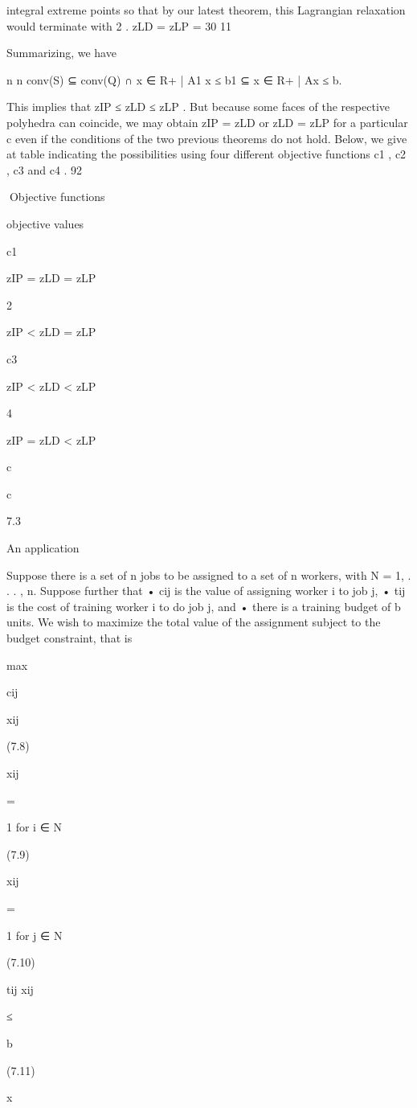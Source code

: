integral extreme points so that by our latest theorem, this Lagrangian relaxation would terminate with
2
.
zLD = zLP = 30 11

Summarizing, we have

n
n
conv(S) ⊆ conv(Q) ∩ {x ∈ R+
| A1 x ≤ b1 } ⊆ {x ∈ R+
| Ax ≤ b}.

This implies that zIP ≤ zLD ≤ zLP . But because some faces of the respective polyhedra can coincide,
we may obtain zIP = zLD or zLD = zLP for a particular c even if the conditions of the two previous
theorems do not hold. Below, we give at table indicating the possibilities using four different objective
functions c1 , c2 , c3 and c4 .
92

Objective functions

objective values

c1

zIP = zLD = zLP

2

zIP < zLD = zLP

c3

zIP < zLD < zLP

4

zIP = zLD < zLP

c

c

7.3

An application

Suppose there is a set of n jobs to be assigned to a set of n workers, with N = {1, . . . , n}. Suppose
further that
• cij is the value of assigning worker i to job j,
• tij is the cost of training worker i to do job j, and
• there is a training budget of b units.
We wish to maximize the total value of the assignment subject to the budget constraint, that is

max

cij

xij

(7.8)

xij

=

1 for i ∈ N

(7.9)

xij

=

1 for j ∈ N

(7.10)

tij xij

≤

b

(7.11)

x

